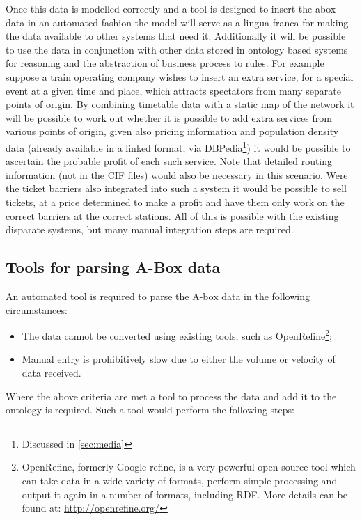 Once this data is modelled correctly and a tool is designed to insert the abox data in an automated fashion the model will serve as a lingua franca for making the data available to other systems that need it. Additionally it will be possible to use the data in conjunction with other data stored in ontology based systems for reasoning and the abstraction of business process to rules. For example suppose a train operating company wishes to insert an extra service, for a special event at a given time and place, which attracts spectators from many separate points of origin. By combining timetable data with a static map of the network it will be possible to work out whether it is possible to add extra services from various points of origin, given also pricing information and population density data (already available in a linked format, via DBPedia\footnote{Discussed in \autoref{sec:media}}) it would be possible to ascertain the probable profit of each such service. Note that detailed routing information (not in the CIF files) would also be necessary in this scenario. Were the ticket barriers also integrated into such a system it would be possible to sell tickets, at a price determined to make a profit and have them only work on the correct barriers at the correct stations. All of this is possible with the existing disparate systems, but many manual integration steps are required.

\subsection{Tools for parsing A-Box data}

An automated tool is required to parse the A-box data in the following circumstances:

 \begin{itemize}
	\item The data cannot be converted using existing tools, such as OpenRefine\footnote{OpenRefine, formerly Google refine, is a very powerful open source tool which can take data in a wide variety of formats, perform simple processing and output it again in a number of formats, including RDF. More details can be found at: \url{http://openrefine.org/}};
	\item Manual entry is prohibitively slow due to either the volume or velocity of data received.
\end{itemize}

Where the above criteria are met a tool to process the data and add it to the ontology is required. Such a tool would perform the following steps:

